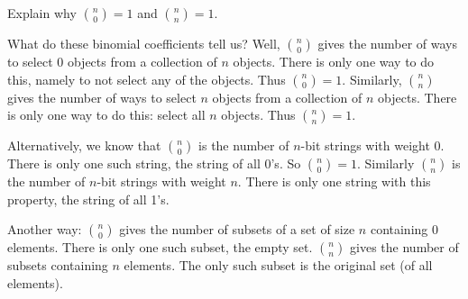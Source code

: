 \documentclass[12pt]{article}
\begin{document}
\begin{example}
  Explain why ${n \choose 0} = 1$ and ${n \choose n} = 1$.
  \begin{solution}
    What do these binomial coefficients tell us? Well, ${n \choose 0}$ gives the number of ways to select 0 objects from a collection of $n$ objects.  There is only one way to do this, namely to not select any of the objects.  Thus ${n \choose 0} = 1$.  Similarly, ${n \choose n}$ gives the number of ways to select $n$ objects from a collection of $n$ objects.  There is only one way to do this: select all $n$ objects.  Thus ${n \choose n} = 1$.
    
    Alternatively, we know that ${n \choose 0}$ is the number of $n$-bit strings with weight 0.  There is only one such string, the string of all 0's.  So ${n \choose 0} = 1$.  Similarly ${n \choose n}$ is the number of $n$-bit strings with weight $n$.  There is only one string with this property, the string of all 1's.
    
    Another way: ${n \choose 0}$ gives the number of subsets of a set of size $n$ containing 0 elements.  There is only one such subset, the empty set.  ${n \choose n}$ gives the number of subsets containing $n$ elements.  The only such subset is the original set (of all elements).
  \end{solution}

\end{example}
\end{document}
